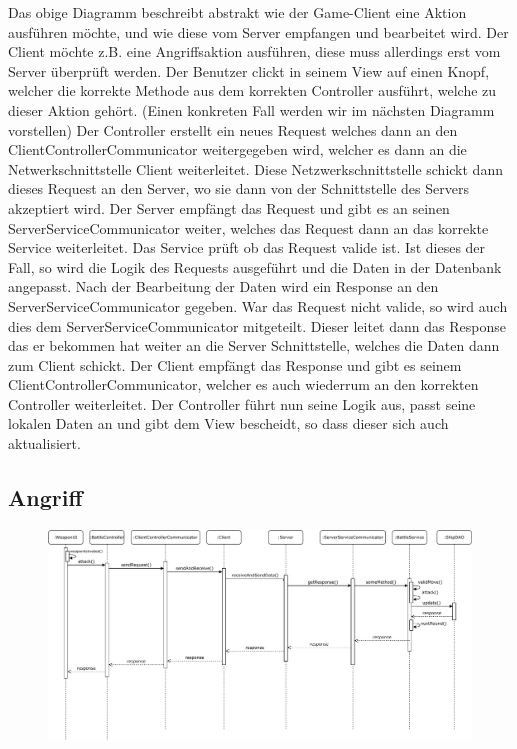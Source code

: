 \documentclass[fontsize=12pt,paper=a4,twoside]{scrartcl}
\begin{document}
Das obige Diagramm beschreibt abstrakt wie der Game-Client eine Aktion ausführen möchte, und wie diese vom Server empfangen und bearbeitet wird.
Der Client möchte z.B. eine Angriffsaktion ausführen, diese muss allerdings erst vom Server überprüft werden. Der Benutzer clickt in seinem View auf einen Knopf, welcher die 
korrekte Methode aus dem korrekten Controller ausführt, welche zu dieser Aktion gehört. (Einen konkreten Fall werden wir im nächsten Diagramm vorstellen)
Der Controller erstellt ein neues Request welches dann an den ClientControllerCommunicator weitergegeben wird, welcher es dann an die Netwerkschnittstelle Client weiterleitet. Diese Netzwerkschnittstelle schickt dann dieses Request an den Server, wo sie dann von der Schnittstelle des Servers akzeptiert wird. Der Server empfängt das Request und gibt es an seinen ServerServiceCommunicator weiter, welches das Request dann an das korrekte Service weiterleitet. Das Service prüft ob das Request valide ist. Ist dieses der Fall, so wird die Logik des Requests ausgeführt und die Daten in der Datenbank angepasst. Nach der Bearbeitung der Daten wird ein Response an den ServerServiceCommunicator gegeben. War das Request nicht valide, so wird auch dies dem ServerServiceCommunicator mitgeteilt. Dieser leitet dann das Response das er bekommen hat weiter an die Server Schnittstelle, welches die Daten dann zum Client schickt. Der Client empfängt das Response und gibt es seinem ClientControllerCommunicator, welcher es auch wiederrum an den korrekten Controller weiterleitet. Der Controller führt nun seine Logik aus, passt seine lokalen Daten an und gibt dem View bescheidt, so dass dieser sich auch aktualisiert.

\subsection{Angriff}

\begin{figure}[H]
\begin{center}
  \includegraphics[width=\linewidth]{UML/Sequenz-Attack.pdf}
\end{center}
\end{figure}
\end{document}
